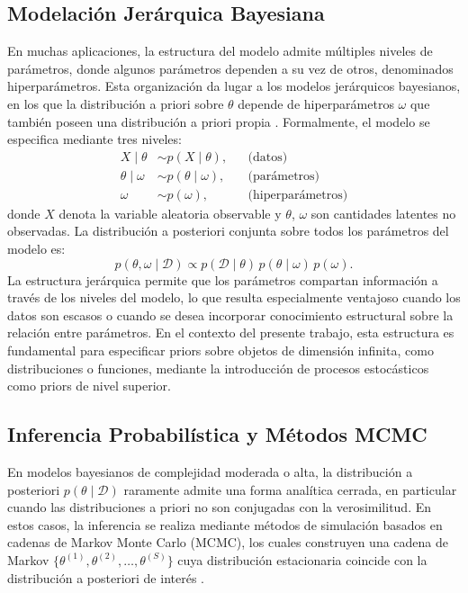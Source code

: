 \subsection{Modelación Jerárquica Bayesiana}
\label{02_03_01_modelacion_jerarquica}
En muchas aplicaciones, la estructura del modelo admite múltiples niveles de parámetros, donde algunos parámetros dependen a su vez de otros, denominados hiperparámetros. Esta organización da lugar a los modelos jerárquicos bayesianos, en los que la distribución a priori sobre $\theta$ depende de hiperparámetros $\omega$ que también poseen una distribución a priori propia \citep{02_03_gelman2013bda}. Formalmente, el modelo se especifica mediante tres niveles:
\begin{align}
    X \mid \theta &\sim p(X \mid \theta), && \text{(datos)} \\
    \theta \mid \omega &\sim p(\theta \mid \omega), && \text{(parámetros)} \\
    \omega &\sim p(\omega), && \text{(hiperparámetros)}
\end{align}
donde $X$ denota la variable aleatoria observable y $\theta$, $\omega$ son cantidades latentes no observadas. La distribución a posteriori conjunta sobre todos los parámetros del modelo es:
\begin{equation}
    p(\theta, \omega \mid \mathcal{D}) \propto p(\mathcal{D} \mid \theta)\, p(\theta \mid \omega)\,
    p(\omega).
\end{equation}
La estructura jerárquica permite que los parámetros compartan información a través de los niveles del modelo, lo que resulta especialmente ventajoso cuando los datos son escasos o cuando se desea incorporar conocimiento estructural sobre la relación entre parámetros. En el contexto del presente trabajo, esta estructura es fundamental para especificar priors sobre objetos de dimensión infinita, como distribuciones o funciones, mediante la introducción de procesos estocásticos como priors de nivel superior.

\subsection{Inferencia Probabilística y Métodos MCMC}
\label{02_03_02_inferencia_probabilistica}

En modelos bayesianos de complejidad moderada o alta, la distribución a posteriori $p(\theta \mid \mathcal{D})$ raramente admite una forma analítica cerrada, en particular cuando las distribuciones a priori no son conjugadas con la verosimilitud. En estos casos, la inferencia se realiza mediante métodos de simulación basados en cadenas de Markov Monte Carlo (MCMC), los cuales construyen una cadena de Markov $\{\theta^{(1)}, \theta^{(2)}, \dots, \theta^{(S)}\}$ cuya distribución estacionaria coincide con la distribución a posteriori de interés \citep{02_07_rizzo2007statistical}.\\


